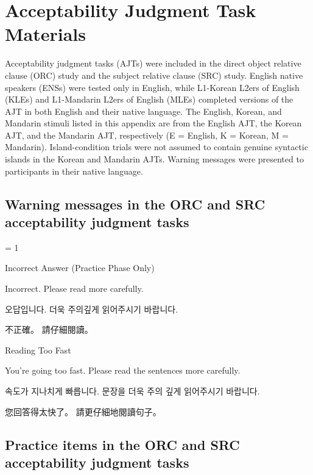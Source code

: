 
\chapter{Acceptability Judgment Task Materials}\label{app-materials-ajt}

Acceptability judgment tasks (AJTs) were included in the direct object relative clause (ORC) study and the subject relative clause (SRC) study. English native speakers (ENSs) were tested only in English, while L1-Korean L2ers of English (KLEs) and L1-Mandarin L2ers of English (MLEs) completed versions of the AJT in both English and their native language. The English, Korean, and Mandarin stimuli listed in this appendix are from the English AJT, the Korean AJT, and the Mandarin AJT, respectively (E = English, K = Korean, M = Mandarin). Island-condition trials were not assumed to contain genuine syntactic islands in the Korean and Mandarin AJTs. Warning messages were presented to participants in their native language. 

\section{Warning messages in the ORC and SRC acceptability judgment tasks}

\excnt = 1

\ex %
Incorrect Answer (Practice Phase Only)\par\nobreak
Incorrect. Please read more carefully.\par\nobreak
\ko 오답입니다. 더욱 주의깊게 읽어주시기 바랍니다.\normalfont\par\nobreak
\zh 不正確。 請仔細閱讀。\normalfont
\xe

\ex %
Reading Too Fast\par\nobreak
You're going too fast. Please read the sentences more carefully.\par\nobreak
\ko 속도가 지나치게 빠릅니다. 문장을 더욱 주의 깊게 읽어주시기 바랍니다.\normalfont\par\nobreak
\zh 您回答得太快了。 請更仔細地閱讀句子。\normalfont
\xe

\section{Practice items in the ORC and SRC acceptability judgment tasks}

